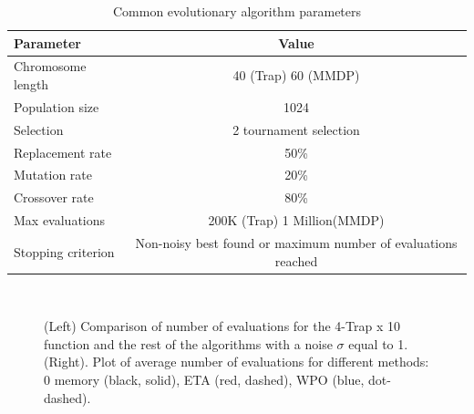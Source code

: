 \documentclass{llncs}
\begin{document}
\begin{table}[!t]%
\begin{center}
\caption{Common evolutionary algorithm parameters}
\label{fig:ga_params}
\begin{tabular}{lc}%
\hline\noalign{\smallskip}
\noalign{\smallskip}
Parameter & Value \\
\hline
\noalign{\smallskip}
Chromosome length & 40 (Trap) 60 (MMDP)\\
Population size & 1024\\
Selection & 2 tournament selection \\
Replacement rate & 50\% \\
Mutation rate & 20\% \\
Crossover rate &  80\% \\
Max evaluations & 200K (Trap) 1 Million(MMDP) \\
Stopping criterion & Non-noisy best found or maximum number of  evaluations reached \\
\hline
\end{tabular}
\end{center}
\end{table}
%
%
%
\begin{figure}[!t] %
\centering
{}
~
\caption{(Left) Comparison of number of evaluations for the 4-Trap x
  10 function and the rest of the algorithms with a noise $\sigma$
  equal to 1. (Right). Plot of average number of evaluations for
  different methods: 0 memory (black, solid), ETA (red, dashed), WPO
  (blue, dot-dashed). \label{fig:trap:evals}}
\end{figure}
\end{document}
